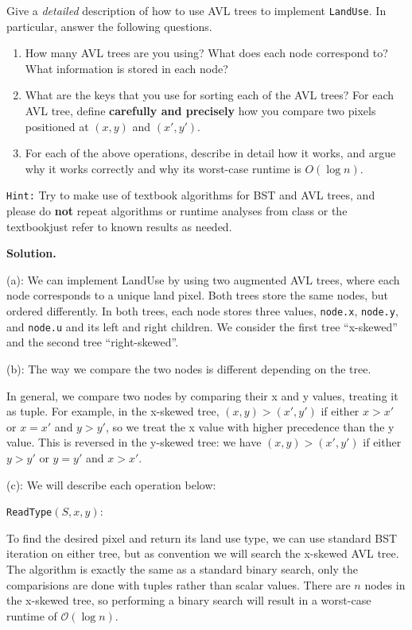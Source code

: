 \documentclass{assignment-263}
\begin{document}
\begin{enumerate}
		Give a \emph{detailed} description of how to use AVL trees to
		implement \texttt{LandUse}. In particular, answer the following
		questions.
		\begin{enumerate}
		\item	How many AVL trees are you using? What does each node
			correspond to? What information is stored in each node?
		\item	What are the keys that you use for sorting each of the AVL
			trees? For each AVL tree, define \textbf{carefully and
			precisely} how you compare two pixels positioned at $(x, y)$ and
			$(x', y')$.
		\item	For each of the above operations, describe in detail how
				it works, and argue why it works correctly and why its
				worst-case runtime is $O(\log n)$.
		\end{enumerate}
		\texttt{Hint:} Try to make use of textbook algorithms for BST and AVL
		trees, and please do \textbf{not} repeat algorithms or runtime
		analyses from class or the textbook\textemdash just refer to known results
		as needed. \hfill \break
\end{enumerate}

\textbf{Solution.}

(a): We can implement LandUse by using two augmented AVL trees, where each node corresponds to a unique land pixel. Both trees store the same nodes, but ordered differently. In both trees, each node stores three values, \verb|node.x|, \verb|node.y|, and \verb|node.u| and its left and right children. We consider the first tree ``x-skewed'' and the second tree ``right-skewed''.

(b): The way we compare the two nodes is different depending on the tree.

In general, we compare two nodes by comparing their x and y values, treating it as tuple. For example, in the x-skewed tree, \((x,y) > (x',y')\) if either \(x > x'\) or \(x = x'\) and \(y > y'\), so we treat the x value with higher precedence than the y value. This is reversed in the y-skewed tree: we have \((x,y) > (x',y')\) if either \(y > y'\) or \(y = y'\) and \(x > x'\).

(c): We will describe each operation below:

\texttt{ReadType}\((S,x,y)\):

To find the desired pixel and return its land use type, we can use standard BST iteration on either tree, but as convention we will search the x-skewed AVL tree. The algorithm is exactly the same as a standard binary search, only the comparisions are done with tuples rather than scalar values. There are \(n\) nodes in the x-skewed tree, so performing a binary search will result in a worst-case runtime of \(\mathcal{O} (\log n)\).
\end{document}
